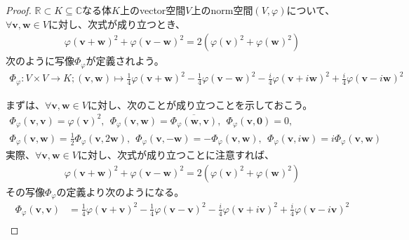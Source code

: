 \documentclass[dvipdfmx]{jsarticle}
\begin{document}
\begin{proof}
$\mathbb{R} \subset K \subseteq \mathbb{C}$なる体$K$上のvector空間$V$上のnorm空間$(V,\varphi)$について、$\forall\mathbf{v},\mathbf{w} \in V$に対し、次式が成り立つとき、
\begin{align*}
{\varphi\left( \mathbf{v} + \mathbf{w} \right)}^{2} + {\varphi\left( \mathbf{v} - \mathbf{w} \right)}^{2} = 2\left( {\varphi\left( \mathbf{v} \right)}^{2} + {\varphi\left( \mathbf{w} \right)}^{2} \right)
\end{align*}
次のように写像$\varPhi_{\varphi}$が定義されよう。
\begin{align*}
\varPhi_{\varphi}:V \times V \rightarrow K;\left( \mathbf{v},\mathbf{w} \right) \mapsto \frac{1}{4}{\varphi\left( \mathbf{v} + \mathbf{w} \right)}^{2} - \frac{1}{4}{\varphi\left( \mathbf{v} - \mathbf{w} \right)}^{2} - \frac{i}{4}{\varphi\left( \mathbf{v} + i\mathbf{w} \right)}^{2} + \frac{i}{4}{\varphi\left( \mathbf{v} - i\mathbf{w} \right)}^{2}
\end{align*}\par
まずは、$\forall\mathbf{v},\mathbf{w} \in V$に対し、次のことが成り立つことを示しておこう。
\begin{align*}
\varPhi_{\varphi}\left( \mathbf{v},\mathbf{v} \right) = {\varphi\left( \mathbf{v} \right)}^{2},\ \ \varPhi_{\varphi}\left( \mathbf{v},\mathbf{w} \right) = \overline{\varPhi_{\varphi}\left( \mathbf{w},\mathbf{v} \right)},\ \ \varPhi_{\varphi}\left( \mathbf{v},\mathbf{0} \right) = 0, \\
\varPhi_{\varphi}\left( \mathbf{v},\mathbf{w} \right) = \frac{1}{2}\varPhi_{\varphi}\left( \mathbf{v},2\mathbf{w} \right),\ \ \varPhi_{\varphi}\left( \mathbf{v}, - \mathbf{w} \right) = - \varPhi_{\varphi}\left( \mathbf{v},\mathbf{w} \right),\ \ \varPhi_{\varphi}\left( \mathbf{v},i\mathbf{w} \right) = i\varPhi_{\varphi}\left( \mathbf{v},\mathbf{w} \right)
\end{align*}
実際、$\forall\mathbf{v},\mathbf{w} \in V$に対し、次式が成り立つことに注意すれば、
\begin{align*}
{\varphi\left( \mathbf{v} + \mathbf{w} \right)}^{2} + {\varphi\left( \mathbf{v} - \mathbf{w} \right)}^{2} = 2\left( {\varphi\left( \mathbf{v} \right)}^{2} + {\varphi\left( \mathbf{w} \right)}^{2} \right)
\end{align*}
その写像$\varPhi_{\varphi}$の定義より次のようになる。
\begin{align*}
\varPhi_{\varphi}\left( \mathbf{v},\mathbf{v} \right) &= \frac{1}{4}{\varphi\left( \mathbf{v} + \mathbf{v} \right)}^{2} - \frac{1}{4}{\varphi\left( \mathbf{v} - \mathbf{v} \right)}^{2} - \frac{i}{4}{\varphi\left( \mathbf{v} + i\mathbf{v} \right)}^{2} + \frac{i}{4}{\varphi\left( \mathbf{v} - i\mathbf{v} \right)}^{2}\\

\end{align*}
\end{proof}
\end{document}

